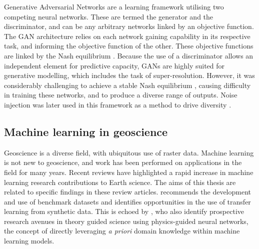 Generative Adversarial Networks \parencite{goodfellowGenerativeAdversarialNets2014} are a learning framework utilising two competing neural networks.
These are termed the generator and the discriminator, and can be any arbitrary networks linked by an objective function.
The GAN architecture relies on each network gaining capability in its respective task, and informing the objective function of the other.
These objective functions are linked by the Nash equilibrium \parencite{salimansImprovedTechniquesTraining2016,lucicAreGANsCreated2018}.
Because the use of a discriminator allows an independent element for predictive capacity, GANs are highly suited for generative modelling, which includes the task of super-resolution.
However, it was considerably challenging to achieve a stable Nash equilibrium \parencite{salimansImprovedTechniquesTraining2016}, causing difficulty in training these networks, and to produce a diverse range of outputs.
Noise injection was later used in this framework as a method to drive diversity \parencite{karrasStylebasedGeneratorArchitecture2018,rakotonirinaESRGANFurtherImproving2020}.



\subsection{Machine learning in geoscience}
\label{sec:introgeoml}

Geoscience is a diverse field, with ubiquitous use of raster data.
Machine learning is not new to geoscience, and work has been performed on applications in the field for many years.
Recent reviews have highlighted a rapid increase in machine learning research contributions to Earth science.
The aims of this thesis are related to specific findings in these review articles.
\textcite{bergenMachineLearningDatadriven2019} recommends the development and use of benchmark datasets and identifies opportunities in the use of transfer learning from synthetic data.
This is echoed by \textcite{karpatneMachineLearningGeosciences2019}, who also identify prospective research avenues in theory guided science using physics-guided neural networks, the concept of directly leveraging \emph{a priori} domain knowledge within machine learning models.

